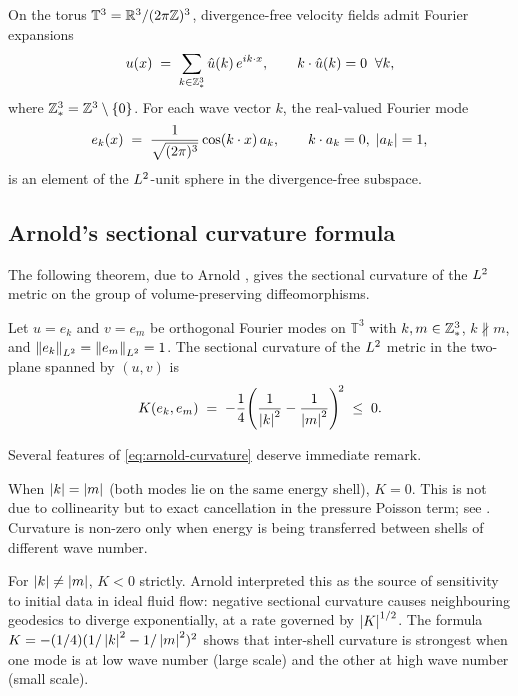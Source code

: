 On the torus $\mathbb{T}^3 = \mathbb{R}^3 / (2\pi\mathbb{Z})^3$, divergence-free velocity fields
admit Fourier expansions
\[
  u(x) \;=\; \sum_{k \in \mathbb{Z}^3_*} \hat{u}(k)\,e^{ik\cdot x},
  \qquad
  k \cdot \hat{u}(k) = 0 \;\;\forall k,
\]
where $\mathbb{Z}^3_* = \mathbb{Z}^3 \setminus \{0\}$.
For each wave vector $k$, the real-valued Fourier mode
\[
  e_k(x) \;=\; \frac{1}{\sqrt{(2\pi)^3}}\cos(k\cdot x)\,a_k, \qquad k\cdot a_k = 0,\;
  \left\lvert a_k \right\rvert = 1,
\]
is an element of the $L^{2}$-unit sphere in the divergence-free subspace.

\subsection{Arnold's sectional curvature formula}

The following theorem, due to Arnold \cite{arnold1966}, gives the sectional curvature
of the $L^{2}$ metric on the group of volume-preserving diffeomorphisms.

\begin{theorem}[Arnold, 1966]\label{thm:arnold-curvature-ch4}
  Let $u = e_k$ and $v = e_m$ be orthogonal Fourier modes on $\mathbb{T}^3$ with
  $k,m \in \mathbb{Z}^3_*$, $k \not\parallel m$, and $\left\lVert e_k \right\rVert_{L^{2}} = \left\lVert e_m \right\rVert_{L^{2}} = 1$.
  The sectional curvature of the $L^{2}$ metric in the two-plane spanned by $(u, v)$ is
  \begin{equation}\label{eq:arnold-curvature}
    K(e_k, e_m) \;=\;
    -\frac{1}{4}\!\left(\frac{1}{\left\lvert k \right\rvert^2} - \frac{1}{\left\lvert m \right\rvert^2}\right)^{\!2}
    \;\leq\; 0.
  \end{equation}
\end{theorem}

Several features of \eqref{eq:arnold-curvature} deserve immediate remark.

\begin{remark}\label{rem:same-shell}
  When $\left\lvert k \right\rvert = \left\lvert m \right\rvert$ (both modes lie on the same energy shell), $K = 0$.
  This is not due to collinearity but to exact cancellation in the pressure Poisson term;
  see .  Curvature is non-zero only when energy is being
  transferred between shells of different wave number.
\end{remark}

\begin{remark}\label{rem:negative-curv}
  For $\left\lvert k \right\rvert \neq \left\lvert m \right\rvert$, $K < 0$ strictly.  Arnold interpreted this as the
  source of sensitivity to initial data in ideal fluid flow: negative sectional curvature
  causes neighbouring geodesics to diverge exponentially, at a rate governed by
  $\left\lvert K \right\rvert^{1/2}$.  The formula $K = -(1/4)(1/\left\lvert k \right\rvert^2 - 1/\left\lvert m \right\rvert^2)^2$ shows
  that inter-shell curvature is strongest when one mode is at low wave number
  (large scale) and the other at high wave number (small scale).
\end{remark}


